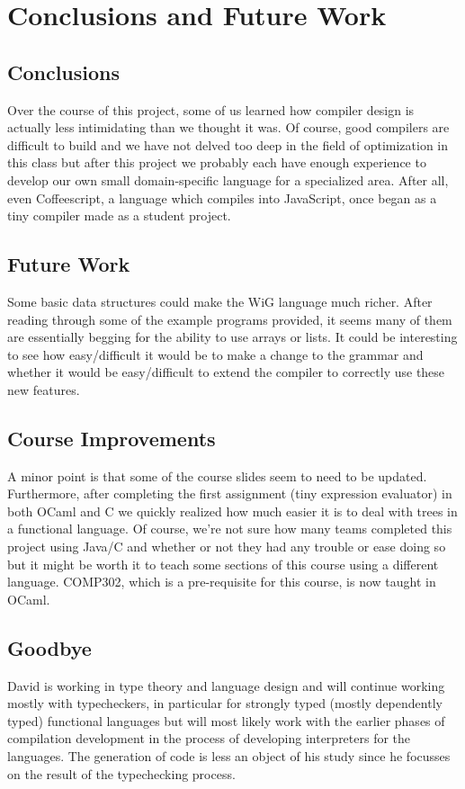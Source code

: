 \documentclass{WigReport}
\begin{document}
\section{Conclusions and Future Work}
\subsection{Conclusions}
Over the course of this project, some of us learned how compiler design is actually less intimidating than we thought it was. Of course, good compilers are difficult to build and we have not delved too deep in the field of optimization in this class but after this project we probably each have enough experience to develop our own small domain-specific language for a specialized area. After all, even Coffeescript, a language which compiles into JavaScript, once began as a tiny compiler made as a student project.

\subsection{Future Work}
Some basic data structures could make the WiG language much richer. After reading through some of the example programs provided, it seems many of them are essentially begging for the ability to use arrays or lists. It could be interesting to see how easy/difficult it would be to make a change to the grammar and whether it would be easy/difficult to extend the compiler to correctly use these new features.

\subsection{Course Improvements}
A minor point is that some of the course slides seem to need to be updated. Furthermore, after completing the first assignment (tiny expression evaluator) in both OCaml and C we quickly realized how much easier it is to deal with trees in a functional language. Of course, we're not sure how many teams completed this project using Java/C and whether or not they had any trouble or ease doing so but it might be worth it to teach some sections of this course using a different language. COMP302, which is a pre-requisite for this course, is now taught in OCaml. 

\subsection{Goodbye}
David is working in type theory and language design and will continue working mostly with typecheckers, in particular for strongly typed (mostly dependently typed) functional languages but will most likely work with the earlier phases of compilation development in the process of developing interpreters for the languages. The generation of code is less an object of his study since he focusses on the result of the typechecking process.
\end{document}
